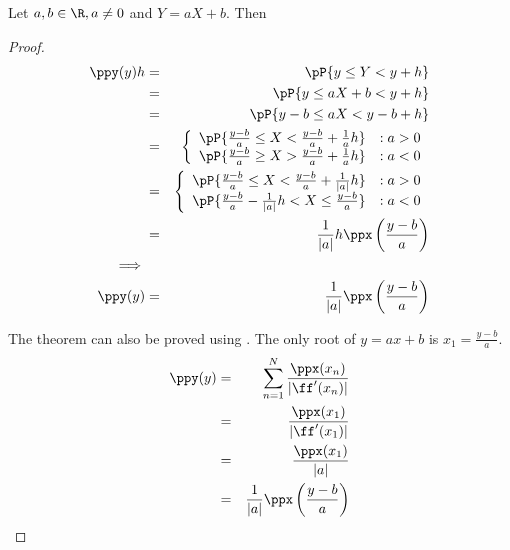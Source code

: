 \begin{proposition}
Let $a,b\in\R, a\ne 0$ and $Y=aX+b$. Then
\end{proposition}
\begin{proof}
\begin{eqnarray*}
  \ppy(y)h
    &=&  \pP{y\le Y < y+h}
  \\&=&  \pP{y\le aX+b < y+h}
  \\&=&  \pP{y-b\le aX < y-b+h}
  \\&=&  \left\{\begin{array}{ll}
           \pP{\frac{y-b}{a}\le X < \frac{y-b}{a}+\frac{1}{a}h} &: a>0 \\
           \pP{\frac{y-b}{a}\ge X > \frac{y-b}{a}+\frac{1}{a}h} &: a<0
         \end{array}\right.
  \\&=&  \left\{\begin{array}{ll}
           \pP{\frac{y-b}{a}\le X < \frac{y-b}{a}+\frac{1}{|a|}h} &: a>0 \\
           \pP{\frac{y-b}{a}-\frac{1}{|a|}h < X \le \frac{y-b}{a}} &: a<0
         \end{array}\right.
  \\&=&  \frac{1}{|a|}h \ppx\left(\frac{y-b}{a}\right)
\\\implies
\\
  \ppy(y)
    &=&  \frac{1}{|a|} \ppx\left(\frac{y-b}{a}\right)
\end{eqnarray*}

The theorem can also be proved using .
The only root of $y=ax+b$ is $x_1=\frac{y-b}{a}$.
\begin{eqnarray*}
  \ppy(y)
    &=& \sum_{n=1}^N \frac{\ppx(x_n)}{|\ff'(x_n)|}
  \\&=& \frac{\ppx(x_1)}{|\ff'(x_1)|}
  \\&=& \frac{\ppx(x_1)}{|a|}
  \\&=& \frac{1}{|a|}\ppx\left(\frac{y-b}{a}\right)
\end{eqnarray*}
\end{proof}





